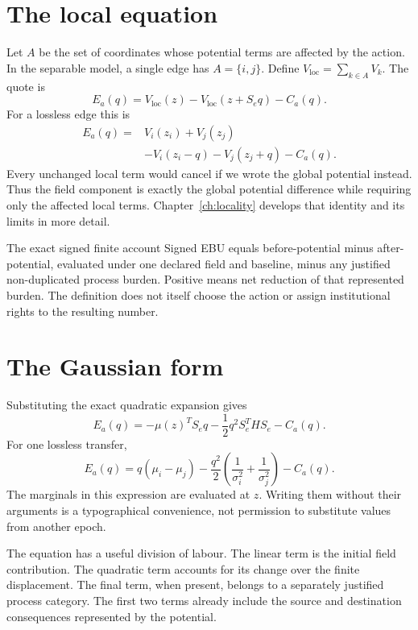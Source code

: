 \section{The local equation}
Let \(A\) be the set of coordinates whose potential terms are affected by the action. In the separable model, a single edge has \(A=\{i,j\}\). Define \(V_{\mathrm{loc}}=\sum_{k\in A}V_k\). The quote is
\begin{equation}\label{eq:exact-local-ebu}
 E_a(q)=V_{\mathrm{loc}}(z)-V_{\mathrm{loc}}(z+S_e q)-C_a(q).
\end{equation}
For a lossless edge this is
\begin{align}
 E_a(q)={}&V_i(z_i)+V_j(z_j)\\
         &-V_i(z_i-q)-V_j(z_j+q)-C_a(q).
\end{align}
Every unchanged local term would cancel if we wrote the global potential instead. Thus the field component is exactly the global potential difference while requiring only the affected local terms. Chapter~\ref{ch:locality} develops that identity and its limits in more detail.

\begin{lawbox}{The exact signed finite account}
Signed EBU equals before-potential minus after-potential, evaluated under one declared field and baseline, minus any justified non-duplicated process burden. Positive means net reduction of that represented burden. The definition does not itself choose the action or assign institutional rights to the resulting number.
\end{lawbox}

\section{The Gaussian form}
Substituting the exact quadratic expansion gives
\begin{equation}\label{eq:gaussian-exact-ebu}
 E_a(q)=-\mu(z)^TS_e q-\frac12q^2 S_e^THS_e-C_a(q).
\end{equation}
For one lossless transfer,
\begin{equation}
 E_a(q)=q(\mu_i-\mu_j)
 -\frac{q^2}{2}\left(\frac1{\sigma_i^2}+\frac1{\sigma_j^2}\right)-C_a(q).
\end{equation}
The marginals in this expression are evaluated at \(z\). Writing them without their arguments is a typographical convenience, not permission to substitute values from another epoch.

The equation has a useful division of labour. The linear term is the initial field contribution. The quadratic term accounts for its change over the finite displacement. The final term, when present, belongs to a separately justified process category. The first two terms already include the source and destination consequences represented by the potential.

